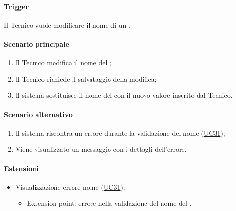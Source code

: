 \paragraph*{Trigger}
Il Tecnico vuole modificare il nome di un .

\paragraph*{Scenario principale}
\begin{enumerate}
  \item Il Tecnico modifica il nome del ;
  \item Il Tecnico richiede il salvataggio della modifica;
  \item Il sistema sostituisce il nome del  con il nuovo valore inserito dal Tecnico.
\end{enumerate}

\paragraph*{Scenario alternativo}
\begin{enumerate}
  \item Il sistema riscontra un errore durante la validazione del nome (\hyperref[UC31]{UC31});
  \item Viene visualizzato un messaggio con i dettagli dell'errore.
\end{enumerate}

\paragraph*{Estensioni}
\begin{itemize}
  \item Visualizzazione errore nome  (\hyperref[UC31]{UC31}).
  \begin{itemize}
    \item Extension point: errore nella validazione del nome del .
  \end{itemize}
\end{itemize}